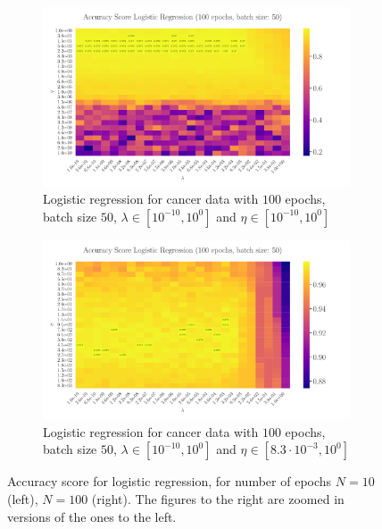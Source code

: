 \documentclass[%
reprint,s
amsmath,amssymb,
aps,
]{revtex4-2}
\begin{document}
\begin{figure}
\begin{subfigure}{0.4353\textwidth}
		\label{fig:LogReg25x25_epoch10_bacthS50_zoomed}
	\end{subfigure}
\hfill\newline
	\begin{subfigure}{0.4353\textwidth}
		\includegraphics[width=\textwidth]{Python/Figures/LogReg25x25_epoch100_batchS50.pdf}
		\caption{Logistic regression for cancer data with \(100\) epochs, batch size \(50\), \(\lambda\in[10^{-10}, 10^{0}]\) and \(\eta\in[10^{-10}, 10^{0}]\)}
		\label{fig:LogReg25x25_epoch100_bacthS50}
	\end{subfigure}
	\hfill
	\begin{subfigure}{0.4353\textwidth}
		\includegraphics[width=\textwidth]{Python/Figures/LogReg25x25_epoch100_batchS50_zoomed.pdf}
		\caption{Logistic regression for cancer data with \(100\) epochs, batch size \(50\), \(\lambda\in[10^{-10}, 10^{0}]\) and \(\eta\in[8.3\cdot 10^{-3}, 10^{0}]\)}
		\label{fig:LogReg25x25_epoch100_bacthS50_zoomed}
	\end{subfigure}
	\caption{Accuracy score for logistic regression, for number of epochs \(N=10\) (left), \(N=100\) (right). The figures to the right are zoomed in versions of the ones to the left.}
	\label{fig:LogReg}
\end{figure}
\end{document}
